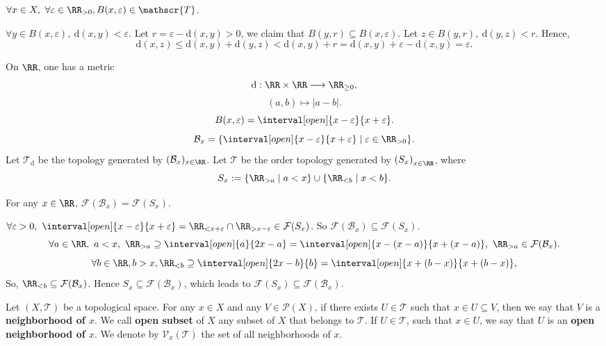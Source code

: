 \begin{propositionenv}
    $\forall x\in X,\ \forall \varepsilon\in \RR_{>0}, B(x,\varepsilon)\in \mathscr{T}$.
\end{propositionenv}
\begin{proofenv}
    $\forall y\in B(x,\varepsilon),\ \mathrm{d}(x,y)<\varepsilon$. Let $r=\varepsilon-\mathrm{d}(x,y)>0$, we claim that $B(y,r)\subseteq B(x,\varepsilon)$. Let $z\in B(y,r), \ \mathrm{d}(y,z)<r$. Hence,
    $$\mathrm{d}(x,z)\le \mathrm{d}(x,y)+\mathrm{d}(y,z)<\mathrm{d}(x,y)+r=\mathrm{d}(x,y)+\varepsilon -\mathrm{d}(x,y)=\varepsilon.$$
\end{proofenv}
\begin{remark}
    On $\RR$, one has a metric 
    $$\mathrm{d}: \RR\times \RR\longrightarrow \RR_{\ge 0},$$
    $$\left(a,b\right)\longmapsto |a-b|.$$
    $$B(x,\varepsilon)=\interval[open]{x-\varepsilon}{x+\varepsilon}.$$
    $$\mathcal{B}_x=\{\interval[open]{x-\varepsilon}{x+\varepsilon}\mid \varepsilon\in \RR_{>0}\}.$$
    Let $\mathscr{T}_\mathrm{d}$ be the topology generated by $(\mathcal{B}_x)_{x\in \RR}$. Let $\mathscr{T}$ be the order topology generated by $\left(S_x\right)_{x\in \RR}$, where 
    $$S_x:=\{\RR_{>a}\mid a<x\}\cup \{\RR_{<b}\mid x<b\}.$$
\end{remark}
\begin{propositionenv}
    For any $x\in \RR$, $\mathcal{F}(\mathcal{B}_x)=\mathcal{F}(S_x)$.
\end{propositionenv}
\begin{proofenv}
    $\forall \varepsilon>0,\ \interval[open]{x-\varepsilon}{x+\varepsilon}=\RR_{<x+\varepsilon}\cap \RR_{>x-\varepsilon}\in \mathcal{F}(S_x)$. So $\mathcal{F}(\mathcal{B}_x)\subseteq \mathcal{F}(S_x)$.
    $$\forall a\in \RR,\ a<x,\ \RR_{>a}\supseteq \interval[open]{a}{2x-a}=\interval[open]{x-(x-a)}{x+(x-a)},\ \RR_{>a}\in \mathcal{F}(\mathcal{B}_x).$$
    $$\forall b\in \RR, b>x,\RR_{<b}\supseteq \interval[open]{2x-b}{b}=\interval[open]{x+(b-x)}{x+(b-x)},$$
    So, $\RR_{<b}\subseteq\mathcal{F}(\mathcal{B}_x)$. Hence $S_x\subseteq \mathcal{F}(\mathcal{B}_x)$, which leads to $\mathcal{F}(S_x)\subseteq\mathcal{F}(\mathcal{B}_x)$.
\end{proofenv}
\begin{definitionenv}
    Let $(X,\mathscr{T})$ be a topological space. For any $x\in X$ and any $V\in \mathscr{P}(X)$, if there exists $U\in \mathscr{T}$ such that $x\in U\subseteq V$, then we say that $V$ is a \textbf{neighborhood of $x$}. We call \textbf{open subset} of $X$ any subset of $X$ that belongs to $\mathscr{T}$. If $U\in \mathscr{T}$, such that $x\in U$, we say that $U$ is an \textbf{open neighborhood of $x$}. We denote by $\mathcal{V}_x(\mathscr{T})$ the set of all neighborhoods of $x$.
\end{definitionenv}

